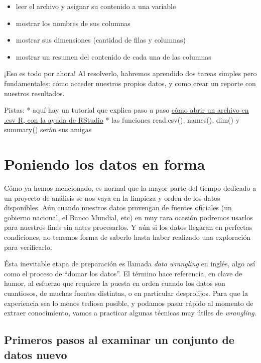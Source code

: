 \documentclass[spanish,]{book}
\providecommand{\tightlist}{%
  \setlength{\itemsep}{0pt}\setlength{\parskip}{0pt}}
\begin{document}
\begin{itemize}
\tightlist
\item
  leer el archivo y asignar su contenido a una variable
\item
  mostrar los nombres de sus columnas
\item
  mostrar sus dimensiones (cantidad de filas y columnas)
\item
  mostrar un resumen del contenido de cada una de las columnas
\end{itemize}

¡Eso es todo por ahora! Al resolverlo, habremos aprendido dos tareas simples pero fundamentales: cómo acceder nuestros propios datos, y como crear un reporte con nuestros resultados.

Pistas:
* aquí hay un tutorial que explica paso a paso \href{https://rpubs.com/HAVB/importar_datos}{cómo abrir un archivo en .csv R, con la ayuda de RStudio}
* las funciones read.csv(), names(), dim() y summary() serán sus amigas

\hypertarget{poniendo-los-datos-en-forma}{%
\chapter{Poniendo los datos en forma}\label{poniendo-los-datos-en-forma}}

Cómo ya hemos mencionado, es normal que la mayor parte del tiempo dedicado a un proyecto de análisis se nos vaya en la limpieza y orden de los datos disponibles. Aún cuando nuestros datos provengan de fuentes oficiales (un gobierno nacional, el Banco Mundial, etc) en muy rara ocasión podremos usarlos para nuestros fines sin antes procesarlos. Y aún si los datos llegaran en perfectas condiciones, no tenemos forma de saberlo hasta haber realizado una exploración para verificarlo.

Ésta inevitable etapa de preparación es llamada \emph{data wrangling} en inglés, algo así como el proceso de ``domar los datos''. El término hace referencia, en clave de humor, al esfuerzo que requiere la puesta en orden cuando los datos son cuantiosos, de muchas fuentes distintas, o en particular desprolijos. Para que la experiencia sea lo menos tediosa posible, y podamos pasar rápido al momento de extraer conocimiento, vamos a practicar algunas técnicas muy útiles de \emph{wrangling}.

\hypertarget{primeros-pasos-al-examinar-un-conjunto-de-datos-nuevo}{%
\section{Primeros pasos al examinar un conjunto de datos nuevo}\label{primeros-pasos-al-examinar-un-conjunto-de-datos-nuevo}}
\end{document}
